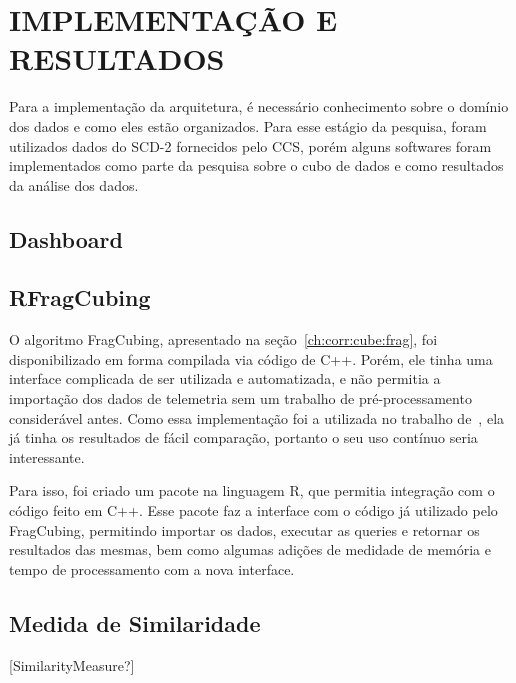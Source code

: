 
\chapter{IMPLEMENTAÇÃO E RESULTADOS}
\label{ch:impl}

Para a implementação da arquitetura, é necessário conhecimento sobre o domínio dos dados e como eles estão organizados. Para esse estágio da pesquisa, foram utilizados dados do SCD-2 fornecidos pelo CCS, porém alguns softwares foram implementados como parte da pesquisa sobre o cubo de dados e como resultados da análise dos dados.

\section{Dashboard}
\label{ch:impl:dash}

\section{RFragCubing}
\label{ch:impl:rfrag}

O algoritmo FragCubing, apresentado na seção~\ref{ch:corr:cube:frag}, foi disponibilizado em forma compilada via código de C++. Porém, ele tinha uma interface complicada de ser utilizada e automatizada, e não permitia a importação dos dados de telemetria sem um trabalho de pré-processamento considerável antes. Como essa implementação foi a utilizada no trabalho de~\cite{silva:2015:abordagensParaCubo}, ela já tinha os resultados de fácil comparação, portanto o seu uso contínuo seria interessante.

Para isso, foi criado um pacote na linguagem R\cite{rcoreteamLanguageEnvironmentStatistical2018}, que permitia integração com o código feito em C++. Esse pacote faz a interface com o código já utilizado pelo FragCubing, permitindo importar os dados, executar as queries e retornar os resultados das mesmas, bem como algumas adições de medidade de memória e tempo de processamento com a nova interface.

\section{Medida de Similaridade}
\label{ch:impl:similarity}

[SimilarityMeasure?]

